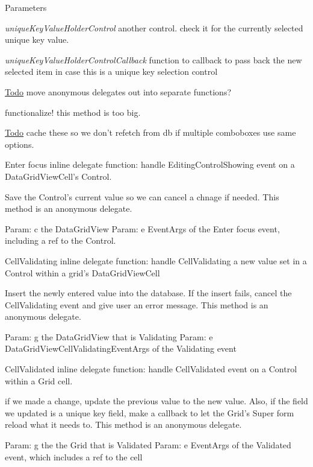 \begin{DoxyParams}{Parameters}
\item[{\em uniqueKeyValueHolderControl}]another control. check it for the currently selected unique key value. \item[{\em uniqueKeyValueHolderControlCallback}]function to callback to pass back the new selected item in case this is a unique key selection control \end{DoxyParams}
\begin{Desc}
\item[\hyperlink{todo__todo000040}{Todo}]move anonymous delegates out into separate functions? 

functionalize! this method is too big. \end{Desc}


\begin{Desc}
\item[\hyperlink{todo__todo000041}{Todo}]cache these so we don't refetch from db if multiple comboboxes use same options. \end{Desc}


Enter focus inline delegate function: handle EditingControlShowing event on a DataGridViewCell's Control.

Save the Control's current value so we can cancel a chnage if needed. This method is an anonymous delegate.

Param: c the DataGridView Param: e EventArgs of the Enter focus event, including a ref to the Control.

CellValidating inline delegate function: handle CellValidating a new value set in a Control within a grid's DataGridViewCell

Insert the newly entered value into the database. If the insert fails, cancel the CellValidating event and give user an error message. This method is an anonymous delegate.

Param: g the DataGridView that is Validating Param: e DataGridViewCellValidatingEventArgs of the Validating event

CellValidated inline delegate function: handle CellValidated event on a Control within a Grid cell.

if we made a change, update the previous value to the new value. Also, if the field we updated is a unique key field, make a callback to let the Grid's Super form reload what it needs to. This method is an anonymous delegate.

Param: g the the Grid that is Validated Param: e EventArgs of the Validated event, which includes a ref to the cell 

